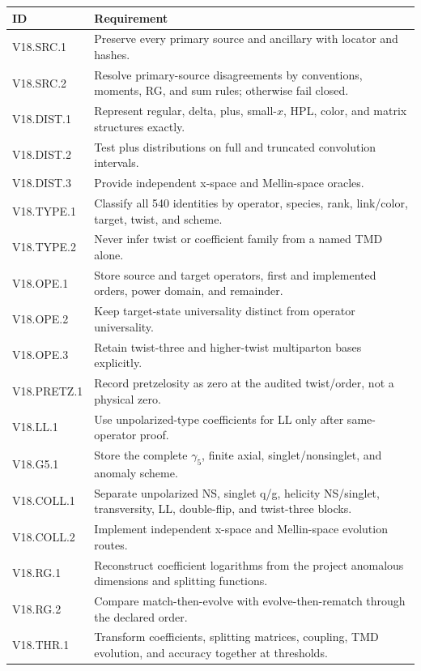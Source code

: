 \documentclass[11pt]{article}
\begin{document}
\footnotesize
\begin{longtable}{L{0.18\textwidth}L{0.74\textwidth}}
\toprule
ID & Requirement\\
\midrule
\endhead
V18.SRC.1 & Preserve every primary source and ancillary with locator and hashes.\\
V18.SRC.2 & Resolve primary-source disagreements by conventions, moments, RG, and sum rules; otherwise fail closed.\\
V18.DIST.1 & Represent regular, delta, plus, small-\(x\), HPL, color, and matrix structures exactly.\\
V18.DIST.2 & Test plus distributions on full and truncated convolution intervals.\\
V18.DIST.3 & Provide independent x-space and Mellin-space oracles.\\
V18.TYPE.1 & Classify all 540 identities by operator, species, rank, link/color, target, twist, and scheme.\\
V18.TYPE.2 & Never infer twist or coefficient family from a named TMD alone.\\
V18.OPE.1 & Store source and target operators, first and implemented orders, power domain, and remainder.\\
V18.OPE.2 & Keep target-state universality distinct from operator universality.\\
V18.OPE.3 & Retain twist-three and higher-twist multiparton bases explicitly.\\
V18.PRETZ.1 & Record pretzelosity as zero at the audited twist/order, not a physical zero.\\
V18.LL.1 & Use unpolarized-type coefficients for LL only after same-operator proof.\\
V18.G5.1 & Store the complete \(\gamma_5\), finite axial, singlet/nonsinglet, and anomaly scheme.\\
V18.COLL.1 & Separate unpolarized NS, singlet q/g, helicity NS/singlet, transversity, LL, double-flip, and twist-three blocks.\\
V18.COLL.2 & Implement independent x-space and Mellin-space evolution routes.\\
V18.RG.1 & Reconstruct coefficient logarithms from the project anomalous dimensions and splitting functions.\\
V18.RG.2 & Compare match-then-evolve with evolve-then-rematch through the declared order.\\
V18.THR.1 & Transform coefficients, splitting matrices, coupling, TMD evolution, and accuracy together at thresholds.\\

\end{longtable}
\end{document}
